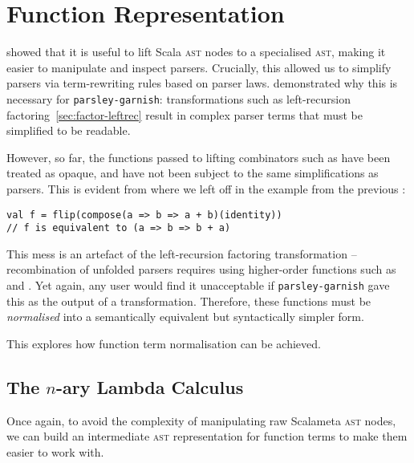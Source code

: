 \documentclass[../../main.tex]{subfiles}
\begin{document}
\section{Function Representation}\label{sec:function-representation}

 showed that it is useful to lift Scala \textsc{ast} nodes to a specialised  \textsc{ast}, making it easier to manipulate and inspect parsers.
Crucially, this allowed us to simplify parsers via term-rewriting rules based on parser laws.
 demonstrated why this is necessary for \texttt{parsley-garnish}: transformations such as left-recursion factoring~\cref{sec:factor-leftrec} result in complex parser terms that must be simplified to be readable.

However, so far, the functions passed to lifting combinators such as  have been treated as opaque, and have not been subject to the same simplifications as parsers.
This is evident from where we left off in the example from the previous :
\begin{verbatim}
val f = flip(compose(a => b => a + b)(identity))
// f is equivalent to (a => b => b + a)
\end{verbatim}
%
This mess is an artefact of the left-recursion factoring transformation -- recombination of unfolded parsers requires using higher-order functions such as  and .
Yet again, any user would find it unacceptable if \texttt{parsley-garnish} gave this as the output of a transformation.
Therefore, these functions must be \emph{normalised} into a semantically equivalent but syntactically simpler form.

This  explores how function term normalisation can be achieved. %

\subsection{The $n$-ary Lambda Calculus}
Once again, to avoid the complexity of manipulating raw Scalameta \textsc{ast} nodes, we can build an intermediate \textsc{ast} representation for function terms to make them easier to work with.
\end{document}
